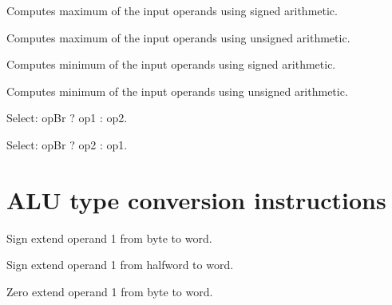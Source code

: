 Computes maximum of the input operands using signed arithmetic.

Computes maximum of the input operands using unsigned arithmetic.

Computes minimum of the input operands using signed arithmetic.

Computes minimum of the input operands using unsigned arithmetic.

Select: opBr ? op1 : op2.

Select: opBr ? op2 : op1.

\section{ALU type conversion instructions}

Sign extend operand 1 from byte to word.

Sign extend operand 1 from halfword to word.

Zero extend operand 1 from byte to word.


